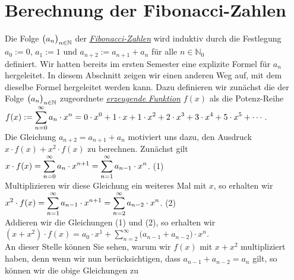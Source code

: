 \section{Berechnung der Fibonacci-Zahlen}
Die Folge $\bigl(a_n\bigr)_{n\in\mathbb{N}}$ der
\href{http://de.wikipedia.org/wiki/Fibonacci-Folge}{\emph{Fibonacci-Zahlen}} wird induktiv durch die
Festlegung  
\\[0.2cm]
\hspace*{1.3cm}
$a_0 := 0$, \quad $a_1 := 1$ \quad und \quad $a_{n+2} := a_{n+1} + a_n$ f\"ur alle $n \in \mathbb{N}_0$
\\[0.2cm]
definiert.  Wir hatten bereits im ersten Semester eine explizite Formel f\"ur $a_n$ hergeleitet.  In
diesem Abschnitt zeigen wir einen anderen Weg auf, mit dem dieselbe Formel hergeleitet werden kann.
Dazu definieren wir zun\"achst die der Folge $\bigl(a_n\bigr)_{n\in\mathbb{N}}$ zugeordnete 
\href{http://de.wikipedia.org/wiki/Erzeugende_Funktion}{\emph{erzeugende Funktion}} $f(x)$ als die Potenz-Reihe
\\[0.2cm]
\hspace*{1.3cm}
$\displaystyle f(x) := \sum\limits_{n=0}^\infty a_n \cdot x^n = 0 \cdot x^0 + 1 \cdot x + 1 \cdot x^2 + 2 \cdot x^3 + 3 \cdot x^4 + 5 \cdot x^5 + \cdots$.
\\[0.2cm]
Die Gleichung $a_{n+2} = a_{n+1} + a_n$ motiviert uns dazu, den Ausdruck
 $x \cdot f(x) + x^2 \cdot f(x)$ zu berechnen.
Zun\"achst gilt
\\[0.2cm]
\hspace*{1.3cm}
$\displaystyle x \cdot f(x) = \sum\limits_{n=0}^\infty a_n \cdot x^{n+1} = \sum\limits_{n=1}^\infty a_{n-1}
\cdot x^n$.  \hspace*{\fill} (1)
\\[0.2cm]
Multiplizieren wir diese Gleichung ein weiteres Mal mit $x$, so erhalten wir
\\[0.2cm]
\hspace*{1.3cm}
$\displaystyle x^2 \cdot f(x) = \sum\limits_{n=1}^\infty a_{n-1} \cdot x^{n+1} = \sum\limits_{n=2}^\infty
a_{n-2} \cdot x^n$.  \hspace*{\fill} (2)
\\[0.2cm]
Addieren wir die Gleichungen (1) und (2), so erhalten wir
\\[0.2cm]
\hspace*{1.3cm}
$(x + x^2) \cdot f(x) = a_0 \cdot x^1 + \sum\limits_{n=2}^\infty \bigl(a_{n-1} + a_{n-2}\bigr) \cdot x^n$.
\\[0.2cm]
An dieser Stelle k\"onnen Sie sehen, warum wir $f(x)$ mit $x + x^2$ multipliziert haben, denn wenn wir
nun ber\"ucksichtigen, dass $a_{n-1} + a_{n-2} = a_n$ gilt, so k\"onnen wir die obige Gleichungen zu
